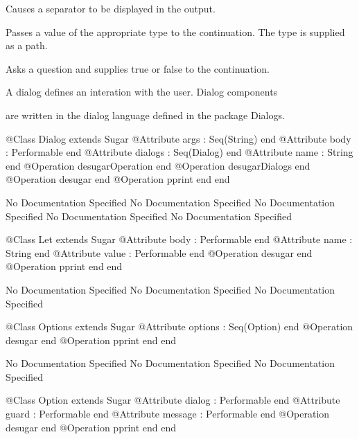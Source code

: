         Causes a separator to be displayed in the output.

        Passes a value of the appropriate type to the continuation.
        The type is supplied as a path.

        Asks a question and supplies true or false to the continuation.

      A dialog defines an interation with the user. Dialog components

      are written in the dialog language defined in the package Dialogs.
\begin{Interface}
@Class Dialog extends Sugar
  @Attribute args : Seq(String) end
  @Attribute body : Performable end
  @Attribute dialogs : Seq(Dialog) end
  @Attribute name : String end
  @Operation desugarOperation end
  @Operation desugarDialogs end
  @Operation desugar end
  @Operation pprint end
end
\end{Interface}
No Documentation Specified
No Documentation Specified
No Documentation Specified
No Documentation Specified
No Documentation Specified
\begin{Interface}
@Class Let extends Sugar
  @Attribute body : Performable end
  @Attribute name : String end
  @Attribute value : Performable end
  @Operation desugar end
  @Operation pprint end
end
\end{Interface}
No Documentation Specified
No Documentation Specified
No Documentation Specified
\begin{Interface}
@Class Options extends Sugar
  @Attribute options : Seq(Option) end
  @Operation desugar end
  @Operation pprint end
end
\end{Interface}
No Documentation Specified
No Documentation Specified
No Documentation Specified
\begin{Interface}
@Class Option extends Sugar
  @Attribute dialog : Performable end
  @Attribute guard : Performable end
  @Attribute message : Performable end
  @Operation desugar end
  @Operation pprint end
end
\end{Interface}
